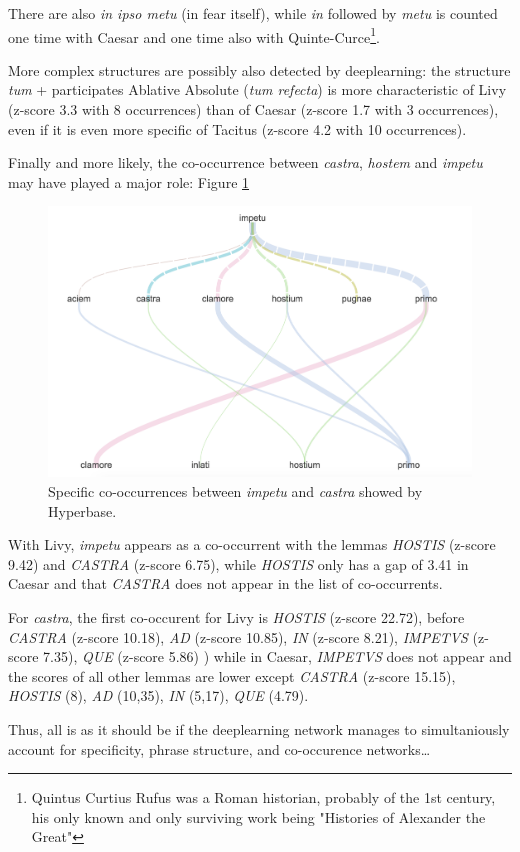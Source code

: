 There are also \textit{in ipso metu} (in fear itself), while \textit{in} followed by \textit{metu} is counted one time with Caesar and one time also with Quinte-Curce\footnote{Quintus Curtius Rufus was a Roman historian, probably of the 1st century, his only known and only surviving work being "Histories of Alexander the Great"}.

More complex structures are possibly also detected by deeplearning: the structure \textit{tum} + participates Ablative Absolute (\textit{tum refecta}) is more characteristic of Livy (z-score 3.3 with 8 occurrences) than of Caesar (z-score 1.7 with 3 occurrences), even if it is even more specific of Tacitus (z-score 4.2 with 10 occurrences).

Finally and more likely, the co-occurrence between \textit{castra}, \textit{hostem} and \textit{impetu} may have played a major role: Figure \ref{latin}

\begin{figure}[h]
\begin{center}
\includegraphics[width=16cm]{img/cooc_latin.png}
\caption{Specific co-occurrences between \textit{impetu} and \textit{castra} showed by Hyperbase.}
\label{latin}
\end{center}
\end{figure}

With Livy, \textit{impetu} appears as a co-occurrent with the lemmas \textit{HOSTIS} (z-score 9.42) and \textit{CASTRA} (z-score 6.75), while \textit{HOSTIS} only has a gap of 3.41 in Caesar and that \textit{CASTRA} does not appear in the list of co-occurrents.

For \textit{castra}, the first co-occurent for Livy is \textit{HOSTIS} (z-score 22.72), before \textit{CASTRA} (z-score 10.18), \textit{AD} (z-score 10.85), \textit{IN} (z-score 8.21), \textit{IMPETVS} (z-score 7.35), \textit{QUE} (z-score 5.86) ) while in Caesar, \textit{IMPETVS} does not appear and the scores of all other lemmas are lower except \textit{CASTRA} (z-score 15.15), \textit{HOSTIS} (8),  \textit{AD} (10,35), \textit{IN} (5,17), \textit{QUE} (4.79).

Thus, all is as it should be if the deeplearning network manages to simultaniously account for specificity, phrase structure, and co-occurence networks\ldots


